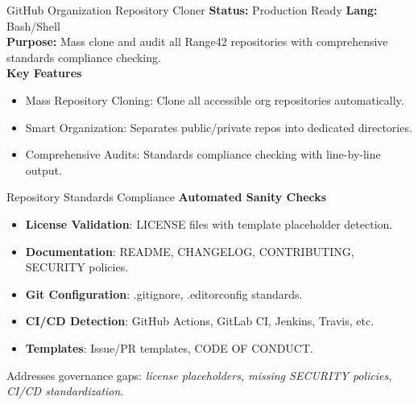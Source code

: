 \documentclass[aspectratio=169]{beamer}
\begin{document}
\begin{frame}{GitHub Organization Repository Cloner}
  \faDownload\;
  \textbf{Status:} Production Ready \hfill \textbf{Lang:} Bash/Shell\\[2mm]
  \textbf{Purpose:} Mass clone and audit all Range42 repositories with comprehensive standards compliance checking.\\[2mm]
  \textbf{Key Features}
  \begin{itemize}
    \item \alert{Mass Repository Cloning}: Clone all accessible org repositories automatically.
    \item \alert{Smart Organization}: Separates public/private repos into dedicated directories.
    \item \alert{Comprehensive Audits}: Standards compliance checking with line-by-line output.
  \end{itemize}
\end{frame}

\begin{frame}{Repository Standards Compliance}
  \faClipboardCheck\;
  \textbf{Automated Sanity Checks}
  \begin{itemize}
    \item \textbf{License Validation}: LICENSE files with template placeholder detection.
    \item \textbf{Documentation}: README, CHANGELOG, CONTRIBUTING, SECURITY policies.
    \item \textbf{Git Configuration}: .gitignore, .editorconfig standards.
    \item \textbf{CI/CD Detection}: GitHub Actions, GitLab CI, Jenkins, Travis, etc.
    \item \textbf{Templates}: Issue/PR templates, CODE OF CONDUCT.
  \end{itemize}
  \begin{tcolorbox}
    \faInfoCircle\; Addresses governance gaps: \emph{license placeholders, missing SECURITY policies, CI/CD standardization}.
  \end{tcolorbox}
\end{frame}
\end{document}
